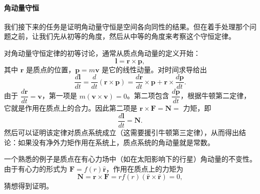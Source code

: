\paragraph{角动量守恒}
我们接下来的任务是证明角动量守恒是空间各向同性的结果。但在着手处理那个问题之前，让我们先从初等的角度，然后从中等的角度来考察这个守恒定律。

对角动量守恒定律的初等讨论，通常从质点角动量的定义开始：
\begin{equation}\label{eq:1.l}
\mathbf{l} = \mathbf{r}\times\mathbf{p},
\end{equation}
其中 $\mathbf{r}$ 是质点的位置，$\mathbf{p} = m\mathbf{v}$ 是它的线性动量。对时间求导给出
\begin{equation}\label{eq:1.dl}
\frac{d\mathbf{l}}{dt} = \frac{d}{dt}(\mathbf{r}\times\mathbf{p}) = \frac{d\mathbf{r}}{dt}\times\mathbf{p} + \mathbf{r}\times\frac{d\mathbf{p}}{dt}.
\end{equation}
由于 $\dfrac{d\mathbf{r}}{dt} = \mathbf{v}$，第一项是 $m(\mathbf{v}\times\mathbf{v}) = 0$。第二项包含 $\dfrac{d\mathbf{p}}{dt}$，根据牛顿第二定律，它就是作用在质点上的合力。因此第二项是 $\mathbf{r}\times\mathbf{F} = \mathbf{N} = $ 力矩，即
\begin{equation}\label{eq:1.dl2}
\frac{d\mathbf{l}}{dt} = \mathbf{N}.
\end{equation}
然后可以证明该定律对质点系统成立（这需要援引牛顿第三定律），从而得出结论：如果没有净外力矩作用在系统上，质点系统的角动量就是常数。

一个熟悉的例子是质点在有心力场中（如在太阳影响下的行星）角动量的不变性。由于有心力的形式为 $\mathbf{F} = f(r)\hat{\mathbf{r}}$，作用在质点上的力矩为
\begin{equation}\label{eq:1.central}
\mathbf{N} = \mathbf{r}\times\mathbf{F} = rf(r)(\hat{\mathbf{r}}\times\hat{\mathbf{r}}) = 0,
\end{equation}
猜想得到证明。

